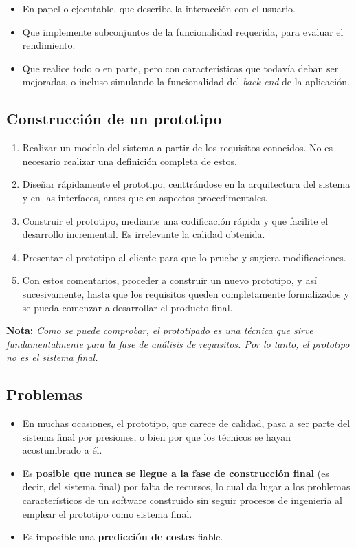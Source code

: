 \begin{itemize}
   \item En papel o ejecutable, que describa la interacción con el usuario.
   \item Que implemente subconjuntos de la funcionalidad requerida, para evaluar el rendimiento.
   \item Que realice todo o en parte, pero con características que todavía deban ser mejoradas, o incluso simulando la funcionalidad del \textit{back-end} de la aplicación.
\end{itemize}

\subsection{Construcción de un prototipo}

\begin{enumerate}
   \item Realizar un modelo del sistema a partir de los requisitos conocidos. No es necesario realizar una definición completa de estos.
   \item Diseñar rápidamente el prototipo, centtrándose en la arquitectura del sistema y en las interfaces, antes que en aspectos procedimentales.
   \item Construir el prototipo, mediante una codificación rápida y que facilite el desarrollo incremental. Es irrelevante la calidad obtenida.
   \item Presentar el prototipo al cliente para que lo pruebe y sugiera modificaciones.
   \item Con estos comentarios, proceder a construir un nuevo prototipo, y así sucesivamente, hasta que los requisitos queden completamente formalizados y se pueda comenzar a desarrollar el producto final.
\end{enumerate}

\textbf{Nota:} \textit{Como se puede comprobar, el prototipado es una técnica que sirve fundamentalmente para la fase de análisis de requisitos. Por lo tanto, el prototipo \uline{no es el sistema final}.}

\subsection{Problemas}
\begin{itemize}
   \item En muchas ocasiones, el prototipo, que carece de calidad, pasa a ser parte del sistema final por presiones, o bien por que los técnicos se hayan acostumbrado a él.
   \item Es \textbf{posible que nunca se llegue a la fase de construcción final} (es decir, del sistema final) por falta de recursos, lo cual da lugar a los problemas característicos de un software construido sin seguir procesos de ingeniería al emplear el prototipo como sistema final.
   \item Es imposible una \textbf{predicción de costes} fiable.
\end{itemize}


